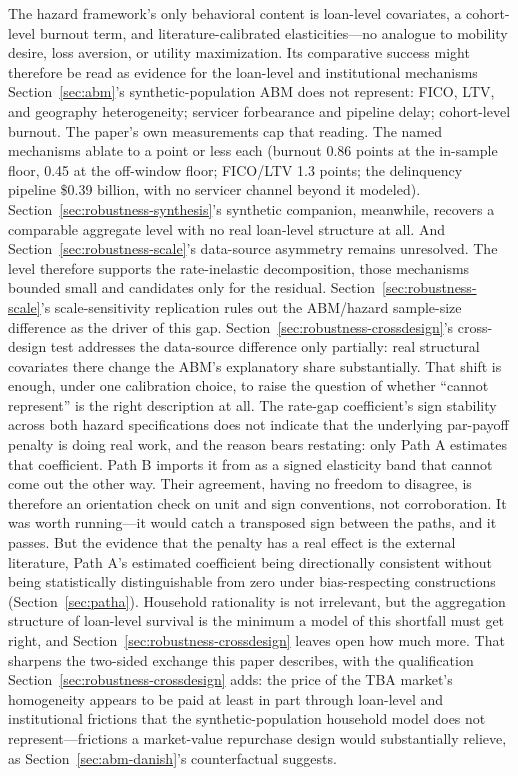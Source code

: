 \documentclass[12pt]{article}
\begin{document}
The hazard framework's only behavioral content is loan-level covariates, a cohort-level burnout term, and literature-calibrated elasticities---no analogue to mobility desire, loss aversion, or utility maximization. Its comparative success might therefore be read as evidence for the loan-level and institutional mechanisms Section~\ref{sec:abm}'s synthetic-population ABM does not represent: FICO, LTV, and geography heterogeneity; servicer forbearance and pipeline delay; cohort-level burnout. The paper's own measurements cap that reading. The named mechanisms ablate to a point or less each (burnout 0.86 points at the in-sample floor, 0.45 at the off-window floor; FICO/LTV 1.3 points; the delinquency pipeline \$0.39 billion, with no servicer channel beyond it modeled). Section~\ref{sec:robustness-synthesis}'s synthetic companion, meanwhile, recovers a comparable aggregate level with no real loan-level structure at all. And Section~\ref{sec:robustness-scale}'s data-source asymmetry remains unresolved. The level therefore supports the rate-inelastic decomposition, those mechanisms bounded small and candidates only for the residual. Section~\ref{sec:robustness-scale}'s scale-sensitivity replication rules out the ABM/hazard sample-size difference as the driver of this gap. Section~\ref{sec:robustness-crossdesign}'s cross-design test addresses the data-source difference only partially: real structural covariates there change the ABM's explanatory share substantially. That shift is enough, under one calibration choice, to raise the question of whether ``cannot represent'' is the right description at all. The rate-gap coefficient's sign stability across both hazard specifications does not indicate that the underlying par-payoff penalty is doing real work, and the reason bears restating: only Path A estimates that coefficient. Path B imports it from \citet{liebersohn2024} as a signed elasticity band that cannot come out the other way. Their agreement, having no freedom to disagree, is therefore an orientation check on unit and sign conventions, not corroboration. It was worth running---it would catch a transposed sign between the paths, and it passes. But the evidence that the penalty has a real effect is the external literature, Path A's estimated coefficient being directionally consistent without being statistically distinguishable from zero under bias-respecting constructions (Section~\ref{sec:patha}). Household rationality is not irrelevant, but the aggregation structure of loan-level survival is the minimum a model of this shortfall must get right, and Section~\ref{sec:robustness-crossdesign} leaves open how much more. That sharpens the two-sided exchange this paper describes, with the qualification Section~\ref{sec:robustness-crossdesign} adds: the price of the TBA market's homogeneity appears to be paid at least in part through loan-level and institutional frictions that the synthetic-population household model does not represent---frictions a market-value repurchase design would substantially relieve, as Section~\ref{sec:abm-danish}'s counterfactual suggests.
\clearpage
\end{document}
